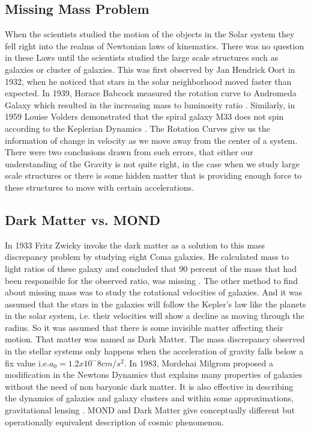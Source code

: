\subsection{Missing Mass Problem}
When the scientists studied the motion of the objects in the Solar system they fell right into the realms of Newtonian laws of kinematics. There was no question in these Laws until the scientists studied the large scale structures such as galaxies or cluster of galaxies. This was first observed by Jan Hendrick Oort in 1932, when he noticed that stars in the solar neighborhood moved faster than expected. In 1939, Horace Babcock measured the rotation curve to Andromeda Galaxy which resulted in the increasing mass to luminosity ratio \cite{missing_mass}. Similarly, in 1959 Louise Volders demonstrated that the spiral galaxy M33 does not spin according to the Keplerian Dynamics \cite{mm}. The Rotation Curves give us the information of change in velocity as we move away from the center of a system. There were two conclusions drawn from such errors, that either our understanding of the Gravity is not quite right, in the case when we study large scale structures or there is some hidden matter that is providing enough force to these structures to move with certain accelerations.

\subsection{Dark Matter vs. MOND}
   In 1933 Fritz Zwicky invoke the dark matter as a solution to this mass discrepancy problem by studying eight Coma galaxies. He calculated mass to light ratios of these galaxy and concluded that 90 percent of the mass that had been responsible for the observed ratio, was missing \cite{dm_3}. The other method to find about missing mass was to study the rotational velocities of galaxies. And it was assumed that the stars in the galaxies will follow the Kepler's law like the planets in the solar system, i.e. their velocities will show a decline as moving through the radius. So it was assumed that there is some invisible matter affecting their motion. That matter was named as Dark Matter.
\cite{mond} \cite{dm_1} \cite{dm_2} The mass discrepancy observed in the stellar systems only happens when the acceleration of gravity falls below a fix value i.e.$a_{0}= 1.2x10^-8 cm/s^2$.\cite{mond_1} In 1983, Mordehai Milgrom proposed a modification in the Newtons Dynamics that explains many properties of galaxies without  the need of non baryonic dark matter. It is also effective in describing the dynamics of galaxies and galaxy clusters and within some approximations, gravitational lensing \cite{mond_2} \cite{mond_3}. MOND and Dark Matter give conceptually different but operationally equivalent description of cosmic phenomenon.


